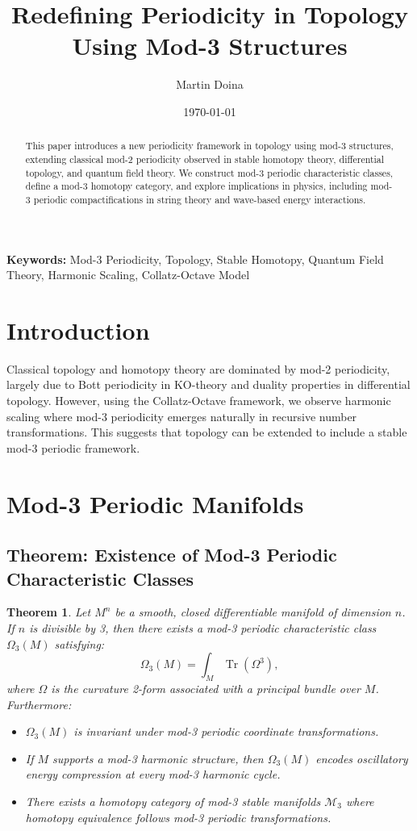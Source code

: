 \documentclass[a4paper,12pt]{article}
\title{Redefining Periodicity in Topology Using Mod-3 Structures}
\author{Martin Doina}
\date{\today}
\newtheorem{theorem}{Theorem}
\begin{document}
\maketitle

\begin{abstract}
This paper introduces a new periodicity framework in topology using mod-3 structures, extending classical mod-2 periodicity observed in stable homotopy theory, differential topology, and quantum field theory. We construct mod-3 periodic characteristic classes, define a mod-3 homotopy category, and explore implications in physics, including mod-3 periodic compactifications in string theory and wave-based energy interactions.
\end{abstract}

\textbf{Keywords:} Mod-3 Periodicity, Topology, Stable Homotopy, Quantum Field Theory, Harmonic Scaling, Collatz-Octave Model

\section{Introduction}
Classical topology and homotopy theory are dominated by mod-2 periodicity, largely due to Bott periodicity in KO-theory and duality properties in differential topology. However, using the Collatz-Octave framework, we observe harmonic scaling where mod-3 periodicity emerges naturally in recursive number transformations. This suggests that topology can be extended to include a stable mod-3 periodic framework.

\section{Mod-3 Periodic Manifolds}

\subsection{Theorem: Existence of Mod-3 Periodic Characteristic Classes}

\begin{theorem}
Let $M^n$ be a smooth, closed differentiable manifold of dimension $n$. If $n$ is divisible by 3, then there exists a mod-3 periodic characteristic class $\Omega_3(M)$ satisfying:
\begin{equation}
\Omega_3(M) = \int_M \operatorname{Tr}(\Omega^3),
\end{equation}
where $\Omega$ is the curvature 2-form associated with a principal bundle over $M$. Furthermore:
\begin{itemize}
    \item $\Omega_3(M)$ is invariant under mod-3 periodic coordinate transformations.
    \item If $M$ supports a mod-3 harmonic structure, then $\Omega_3(M)$ encodes oscillatory energy compression at every mod-3 harmonic cycle.
    \item There exists a homotopy category of mod-3 stable manifolds $\mathcal{M}_3$ where homotopy equivalence follows mod-3 periodic transformations.
\end{itemize}
\end{theorem}
\end{document}
